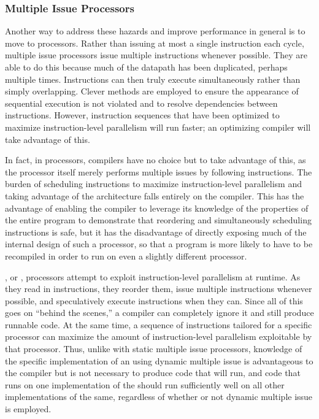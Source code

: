 \subsubsection{Multiple Issue Processors}
Another way to address these hazards and improve performance in general is to move to  processors. Rather than issuing at most a single instruction each cycle, multiple issue processors issue multiple instructions whenever possible. They are able to do this because much of the datapath has been duplicated, perhaps multiple times. Instructions can then truly execute simultaneously rather than simply overlapping. Clever methods are employed to ensure the appearance of sequential execution is not violated and to resolve dependencies between instructions. However, instruction sequences that have been optimized to maximize instruction-level parallelism will run faster; an optimizing compiler will take advantage of this.

In fact, in  processors, compilers have no choice but to take advantage of this, as the processor itself merely performs multiple issues by following instructions. The burden of scheduling instructions to maximize instruction-level parallelism and taking advantage of the architecture falls entirely on the compiler. This has the advantage of enabling the compiler to leverage its knowledge of the properties of the entire program to demonstrate that reordering and simultaneously scheduling instructions is safe, but it has the disadvantage of directly exposing much of the internal design of such a processor, so that a program is more likely to have to be recompiled in order to run on even a slightly different processor.%

, or , processors attempt to exploit instruction-level parallelism at runtime. As they read in instructions, they reorder them, issue multiple instructions whenever possible, and speculatively execute instructions when they can. Since all of this goes on ``behind the scenes,'' a compiler can completely ignore it and still produce runnable code. At the same time, a sequence of instructions tailored for a specific processor can maximize the amount of instruction-level parallelism exploitable by that processor. Thus, unlike with static multiple issue processors, knowledge of the specific implementation of an \ISA using dynamic multiple issue is advantageous to the compiler but is not necessary to produce code that will run, and code that runs on one implementation of the \ISA should run sufficiently well on all other implementations of the same, regardless of whether or not dynamic multiple issue is employed.%

